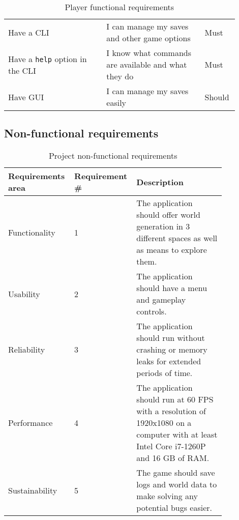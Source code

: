 \documentclass[12pt]{article}
\begin{document}
\begin{table}[H]
\begin{tabular}{p{0.4\linewidth}|p{0.4\linewidth}|p{0.1\linewidth}}
        Have a CLI                                                 & I can manage my saves and other game options                       & Must           \\
        Have a \texttt{help} option in the CLI                     & I know what commands are available and what they do                & Must           \\
        Have GUI                                                   & I can manage my saves easily                                       & Should         \\ \hline
    \end{tabular}
    \caption{Player functional requirements}
\end{table}

\subsection{Non-functional requirements}

\begin{table}[H]
    \begin{tabular}{|p{0.25\linewidth}|p{0.2\linewidth}|p{0.4\linewidth}|}
        \hline
        \textbf{Requirements area} & \textbf{Requirement \#} & \textbf{Description}                                                                                                                  \\ \hline
        Functionality              & 1                       & The application should offer world generation in 3 different spaces as well as means to explore them.                                 \\ \hline
        Usability                  & 2                       & The application should have a menu and gameplay controls.                                                                             \\ \hline
        Reliability                & 3                       & The application should run without crashing or memory leaks for extended periods of time.                                             \\ \hline
        Performance                & 4                       & The application should run at 60 FPS with a resolution of 1920x1080 on a computer with at least Intel Core i7-1260P and 16 GB of RAM. \\ \hline
        Sustainability             & 5                       & The game should save logs and world data to make solving any potential bugs easier.                                                   \\ \hline
    \end{tabular}
    \caption{Project non-functional requirements}
\end{table}
\end{document}
